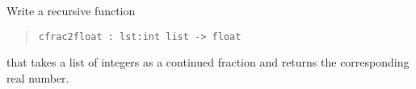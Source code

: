 Write a recursive function
\begin{quote}
  \lstinline{cfrac2float : lst:int list -> float}
\end{quote}
that takes a list of integers as a continued fraction and returns the
corresponding real number.
